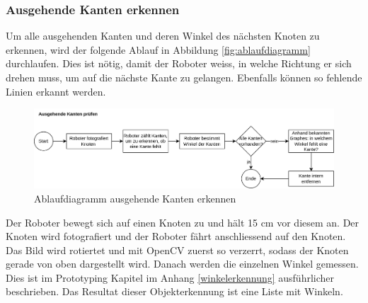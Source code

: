 \subsubsection{Ausgehende Kanten erkennen}

Um alle ausgehenden Kanten und deren Winkel des nächsten Knoten zu erkennen, wird der folgende Ablauf in Abbildung \ref{fig:ablaufdiagramm} durchlaufen. Dies ist nötig, damit der Roboter weiss, in welche Richtung er sich drehen muss, um auf die nächste Kante zu gelangen. Ebenfalls können so fehlende Linien erkannt werden.

\begin{figure}[H]
\centering
\includegraphics[width=\textwidth]{assets/gesamtkonzept/ablaufdiagramm-kanten-erkennen.png}
\caption{Ablaufdiagramm ausgehende Kanten erkennen}
\label{fig:ablaufdiagramm-kanten-erkennen}
\end{figure}

Der Roboter bewegt sich auf einen Knoten zu und hält 15 cm vor diesem an. Der Knoten wird fotografiert und der Roboter fährt anschliessend auf den Knoten. Das Bild wird rotiertet und mit OpenCV zuerst so verzerrt, sodass der Knoten gerade von oben dargestellt wird. Danach werden die einzelnen Winkel gemessen. Dies ist im Prototyping Kapitel im Anhang \ref{winkelerkennung} ausführlicher beschrieben. Das Resultat dieser Objekterkennung ist eine Liste mit Winkeln.

